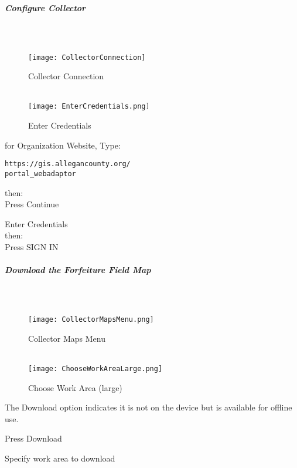 \documentclass[class=article , crop=false, titlepage, twoside, multi={itemize, figure, verbatim}, float=false]{standalone}
\begin{document}
\clearpage
\subparagraph{Configure Collector}

\subparagraph*{\\}
\begin{wrapfigure}{r}{0.5\textwidth}
\centering
\texttt{[image: CollectorConnection]}
\caption{Collector Connection}
\vspace{.25in}
\HRule \\[.4cm] %
\vspace{.25in}
\texttt{[image: EnterCredentials.png]}
\caption{Enter Credentials}
\end{wrapfigure}
for Organization Website, Type:
\vspace{.5in}

\begin{verbatim}
https://gis.allegancounty.org/
portal_webadaptor

\end{verbatim}

then:\\

Press \Large Continue

\vspace{3in}
Enter Credentials\\

then:\\

Press \Large SIGN IN
\clearpage
\subparagraph{Download the Forfeiture Field Map}

\subparagraph*{\\}
\begin{wrapfigure}{r}{0.5\textwidth}
\centering
\texttt{[image: CollectorMapsMenu.png]}
\caption{Collector Maps Menu}
\vspace{.25in}
\HRule \\[.4cm] %
\vspace{.25in}
\texttt{[image: ChooseWorkAreaLarge.png]}
\caption{Choose Work Area (large)}
\end{wrapfigure}
The Download option indicates it is not on the device but is available for offline use.
\vspace{.5in}

\noindent Press Download\\
\vspace{3in}

\noindent Specify work area to download\\
\vspace{.5in}
\end{document}
